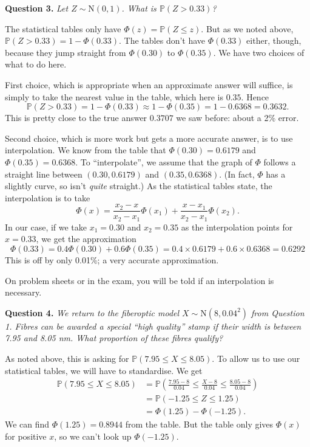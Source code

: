 \documentclass[
  a4paper,
]{book}
\theoremstyle{definition}
\theoremstyle{definition}
\theoremstyle{definition}
\theoremstyle{definition}
\theoremstyle{remark}
\begin{document}
\textbf{Question 3.} \emph{Let \(Z \sim \mathrm{N}(0,1)\). What is \(\mathbb P(Z > 0.33)\)?}

The statistical tables only have \(\Phi(z) = \mathbb P(Z \leq z)\). But as we noted above, \(\mathbb P(Z > 0.33) = 1 - \Phi(0.33)\). The tables don't have \(\Phi(0.33)\) either, though, because they jump straight from \(\Phi(0.30)\) to \(\Phi(0.35)\). We have two choices of what to do here.

First choice, which is appropriate when an approximate answer will suffice, is simply to take the nearest value in the table, which here is \(0.35\). Hence
\[ \mathbb P(Z > 0.33) = 1 - \Phi(0.33) \approx 1 - \Phi(0.35) = 1 - 0.6368 = 0.3632 . \]
This is pretty close to the true answer \(0.3707\) we saw before: about a 2\% error.

Second choice, which is more work but gets a more accurate answer, is to use interpolation. We know from the table that \(\Phi(0.30) = 0.6179\) and \(\Phi(0.35) = 0.6368\). To ``interpolate'', we assume that the graph of \(\Phi\) follows a straight line between \((0.30, 0.6179)\) and \((0.35, 0.6368)\). (In fact, \(\Phi\) has a slightly curve, so isn't \emph{quite} straight.) As the statistical tables state, the interpolation is to take
\[ \Phi(x) = \frac{x_2 - x}{x_2 - x_1} \Phi(x_1) + \frac{x - x_1}{x_2 - x_1} \Phi(x_2) .\]
In our case, if we take \(x_1 = 0.30\) and \(x_2 = 0.35\) as the interpolation points for \(x = 0.33\), we get the approximation
\[ \Phi(0.33) = 0.4 \Phi(0.30) + 0.6 \Phi(0.35) = 0.4\times 0.6179 + 0.6 \times 0.6368 = 0.6292 \]
This is off by only 0.01\%; a very accurate approximation.

On problem sheets or in the exam, you will be told if an interpolation is necessary.

\textbf{Question 4.} \emph{We return to the fiberoptic model \(X \sim \mathrm{N}(8, 0.04^2)\) from Question 1. Fibres can be awarded a special ``high quality'' stamp if their width is between 7.95 and 8.05 nm. What proportion of these fibres qualify?}

As noted above, this is asking for \(\mathbb P(7.95 \leq X \leq 8.05)\). To allow us to use our statistical tables, we will have to standardise. We get
\begin{align*}
\mathbb P(7.95 \leq X \leq 8.05)
  &= \mathbb P \left(\frac{7.95 - 8}{0.04} \leq \frac{X - 8}{0.04} \leq \frac{8.05 - 8}{0.04}\right) \\
  &= \mathbb P(-1.25 \leq Z \leq 1.25) \\
  &= \Phi(1.25) - \Phi(-1.25) .
\end{align*}
We can find \(\Phi(1.25) = 0.8944\) from the table. But the table only gives \(\Phi(x)\) for positive \(x\), so we can't look up \(\Phi(-1.25)\).
\end{document}
